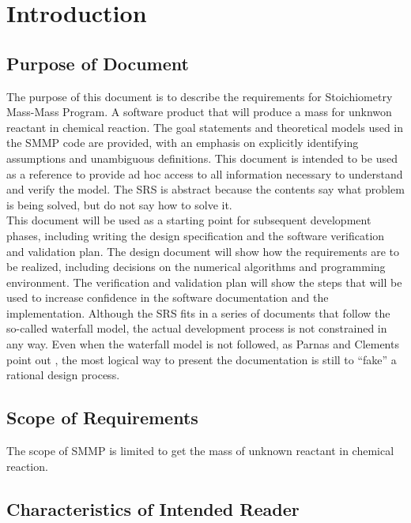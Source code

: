 \documentclass[12pt]{article}
\begin{document}
\newpage




\section{Introduction}



\subsection{Purpose of Document}
The purpose of this document is to describe the requirements for Stoichiometry Mass-Mass Program. A software product that will
produce a mass for unknwon reactant in chemical reaction. The goal statements and theoretical models used in the SMMP code are provided, with an emphasis on explicitly identifying assumptions and unambiguous definitions. This document is intended to be used as a reference to provide ad hoc access to all information necessary to understand and verify the model. The SRS is abstract because the contents say what problem is being solved, but do not say how to solve it.\\
 This document will be used as a starting point for subsequent development phases, including writing the design specification and the software verification and validation plan. The design document will show how the requirements are to be realized, including decisions
on the numerical algorithms and programming environment. The verification and validation plan will show the steps that will be used to increase confidence in the software documentation and the implementation. Although the SRS fits in a series of documents that follow
the so-called waterfall model, the actual development process is not constrained in any way. Even when the waterfall model is not followed, as Parnas and Clements point out \cite{Parnas:Clements:1986}, the most logical way to present the documentation is still to “fake” a rational design process.


\subsection{Scope of Requirements} 

The scope of SMMP is limited to get the mass of unknown reactant in chemical reaction. 

\subsection{Characteristics of Intended Reader} \label{sec_IntendedReader}
\end{document}
